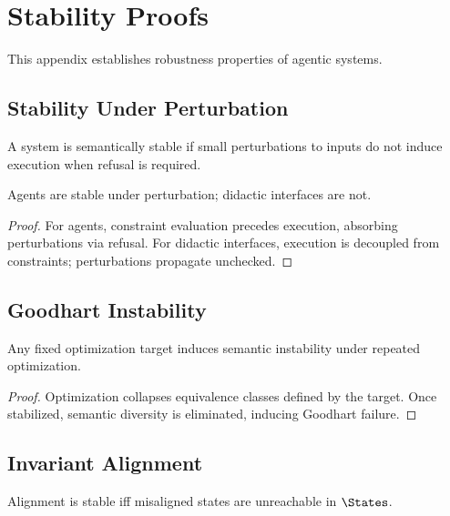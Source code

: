 \section{Stability Proofs}

This appendix establishes robustness properties of agentic systems.

\subsection{Stability Under Perturbation}

\begin{definition}
A system is semantically stable if small perturbations to inputs do not induce execution when refusal is required.
\end{definition}

\begin{theorem}
Agents are stable under perturbation; didactic interfaces are not.
\end{theorem}

\begin{proof}
For agents, constraint evaluation precedes execution, absorbing perturbations via refusal.  
For didactic interfaces, execution is decoupled from constraints; perturbations propagate unchecked.
\end{proof}

\subsection{Goodhart Instability}

\begin{theorem}
Any fixed optimization target induces semantic instability under repeated optimization.
\end{theorem}

\begin{proof}
Optimization collapses equivalence classes defined by the target. Once stabilized, semantic diversity is eliminated, inducing Goodhart failure.
\end{proof}

\subsection{Invariant Alignment}

\begin{corollary}
Alignment is stable iff misaligned states are unreachable in $\States$.
\end{corollary}

